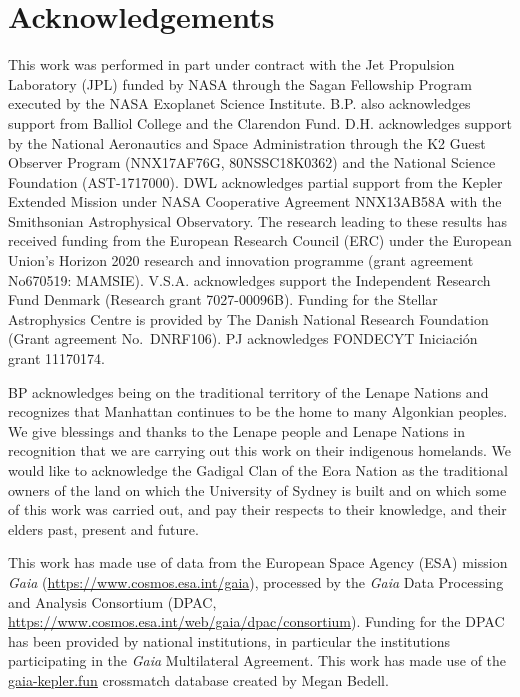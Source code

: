 \documentclass[a4paper,fleqn,usenatbib]{mnras}
\begin{document}
\section*{Acknowledgements} %

This work was performed in part under contract with the Jet Propulsion Laboratory (JPL) funded by NASA through the Sagan Fellowship Program executed by the NASA Exoplanet Science Institute. B.P. also acknowledges support from Balliol College and the Clarendon Fund. D.H. acknowledges support by the National Aeronautics and Space Administration through the K2 Guest Observer Program (NNX17AF76G, 80NSSC18K0362) and the National Science Foundation (AST-1717000). DWL acknowledges partial support from the Kepler Extended Mission under NASA Cooperative Agreement NNX13AB58A with the Smithsonian Astrophysical Observatory. The research leading to these results has received funding from the European Research Council (ERC) under the European Union's Horizon 2020 research and innovation programme (grant agreement No670519: MAMSIE). V.S.A. acknowledges support the Independent Research Fund Denmark (Research grant 7027-00096B). Funding for the Stellar Astrophysics Centre is provided by The Danish National Research Foundation (Grant agreement No.~DNRF106). PJ acknowledges FONDECYT Iniciaci\'on grant 11170174.

BP acknowledges being on the traditional territory of the Lenape Nations and recognizes that Manhattan continues to be the home to many Algonkian peoples. We give blessings and thanks to the Lenape people and Lenape Nations in recognition that we are carrying out this work on their indigenous homelands. We would like to acknowledge the Gadigal Clan of the Eora Nation as the traditional owners of the land on which the University of Sydney is built and on which some of this work was carried out, and pay their respects to their knowledge, and their elders past, present and future.

This work has made use of data from the European Space Agency (ESA) mission
{\it Gaia} (\url{https://www.cosmos.esa.int/gaia}), processed by the {\it Gaia}
Data Processing and Analysis Consortium (DPAC,
\url{https://www.cosmos.esa.int/web/gaia/dpac/consortium}). Funding for the DPAC
has been provided by national institutions, in particular the institutions
participating in the {\it Gaia} Multilateral Agreement. This work has made use of the \url{gaia-kepler.fun} crossmatch database created by Megan Bedell.
\end{document}
